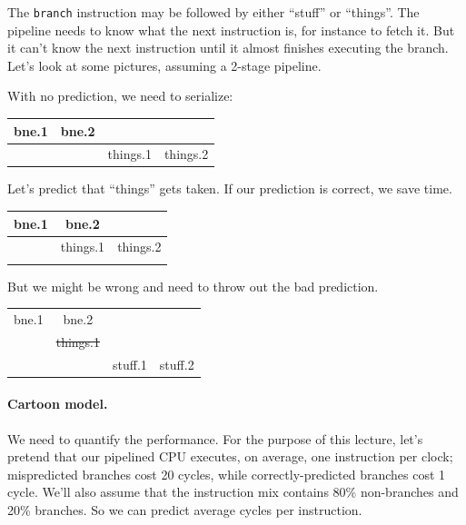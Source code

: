 \documentclass[a4paper]{report}
\begin{document}
The {\tt branch} instruction may be followed by either ``stuff'' or ``things''.
The pipeline needs to know what the next instruction is, for instance to fetch it.
But it can't know the next instruction until it almost finishes executing the branch.
Let's look at some pictures, assuming a 2-stage pipeline.

With no prediction, we need to serialize:

\begin{center}
\begin{tabular}{c|c|c|c}
bne.1 & bne.2 \\ \hline
& & things.1 & things.2
\end{tabular}
\end{center}

\begin{minipage}{.49\textwidth}
Let's predict that ``things'' gets taken.
If our prediction is correct, we save time.

\begin{center}
\begin{tabular}{c|c|c}
bne.1 & bne.2 \\ \hline
& things.1 & things.2 \\
\\
\end{tabular}
\end{center}
\end{minipage} \hspace*{.02\textwidth} \begin{minipage}{.49\textwidth}
But we might be wrong and need to throw out the bad prediction.

\begin{center}
\begin{tabular}{c|c|c|c}
bne.1 & bne.2 \\ \cline{1-2}
& \sout{things.1} \\ \hline
& & stuff.1 & stuff.2
\end{tabular}
\end{center}
\end{minipage}

\paragraph{Cartoon model.} We need to quantify the performance.
For the purpose of this lecture, let's pretend that our pipelined
CPU executes, on average, one instruction per clock;
mispredicted branches cost 20 cycles, while correctly-predicted
branches cost 1 cycle. We'll also assume that the instruction
mix contains 80\% non-branches and 20\% branches. So we can predict
average cycles per instruction.
\end{document}
